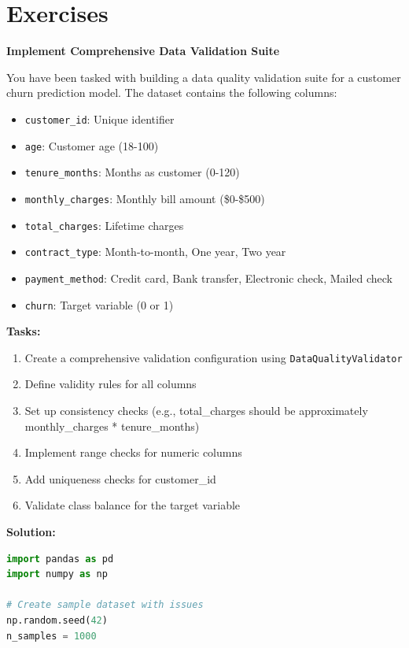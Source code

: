 \section{Exercises}

\begin{exercise}
\textbf{Implement Comprehensive Data Validation Suite}

You have been tasked with building a data quality validation suite for a customer churn prediction model. The dataset contains the following columns:

\begin{itemize}
    \item \texttt{customer\_id}: Unique identifier
    \item \texttt{age}: Customer age (18-100)
    \item \texttt{tenure\_months}: Months as customer (0-120)
    \item \texttt{monthly\_charges}: Monthly bill amount (\$0-\$500)
    \item \texttt{total\_charges}: Lifetime charges
    \item \texttt{contract\_type}: Month-to-month, One year, Two year
    \item \texttt{payment\_method}: Credit card, Bank transfer, Electronic check, Mailed check
    \item \texttt{churn}: Target variable (0 or 1)
\end{itemize}

\textbf{Tasks:}
\begin{enumerate}
    \item Create a comprehensive validation configuration using \texttt{DataQualityValidator}
    \item Define validity rules for all columns
    \item Set up consistency checks (e.g., total\_charges should be approximately monthly\_charges * tenure\_months)
    \item Implement range checks for numeric columns
    \item Add uniqueness checks for customer\_id
    \item Validate class balance for the target variable
\end{enumerate}

\textbf{Solution:}

\begin{lstlisting}[language=Python]
import pandas as pd
import numpy as np

# Create sample dataset with issues
np.random.seed(42)
n_samples = 1000


\end{lstlisting}
\end{exercise}
